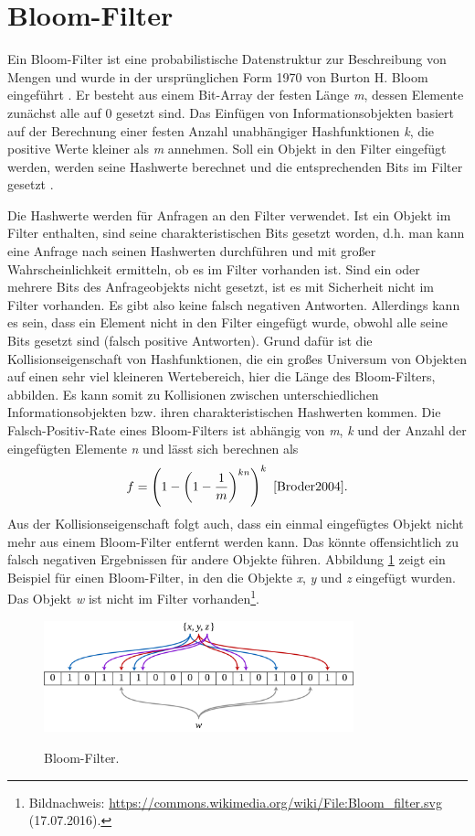 \section{Bloom-Filter}\label{sec:bloom}
Ein Bloom-Filter ist eine probabilistische Datenstruktur zur Beschreibung von Mengen und wurde in der ursprünglichen Form 1970 von Burton H. Bloom eingeführt \cite{Bloom1970}. Er besteht aus einem Bit-Array der festen Länge \textit{m}, dessen Elemente zunächst alle auf 0 gesetzt sind. Das Einfügen von Informationsobjekten basiert auf der Berechnung einer festen Anzahl unabhängiger Hashfunktionen \textit{k}, die positive Werte kleiner als \textit{m} annehmen. Soll ein Objekt in den Filter eingefügt werden, werden seine Hashwerte berechnet und die entsprechenden Bits im Filter gesetzt \cite{Broder2004}. 

Die Hashwerte werden für Anfragen an den Filter verwendet. Ist ein Objekt im Filter enthalten, sind seine charakteristischen Bits gesetzt worden, d.h. man kann eine Anfrage nach seinen Hashwerten durchführen und mit großer Wahrscheinlichkeit ermitteln, ob es im Filter vorhanden ist. Sind ein oder mehrere Bits des Anfrageobjekts nicht gesetzt, ist es mit Sicherheit nicht im Filter vorhanden. Es gibt also keine falsch negativen Antworten. Allerdings kann es sein, dass ein Element nicht in den Filter eingefügt wurde, obwohl alle seine Bits gesetzt sind (falsch positive Antworten). Grund dafür ist die Kollisionseigenschaft von Hashfunktionen, die ein großes Universum von Objekten auf einen sehr viel kleineren Wertebereich, hier die Länge des Bloom-Filters, abbilden. Es kann somit zu Kollisionen zwischen unterschiedlichen Informationsobjekten bzw. ihren charakteristischen Hashwerten kommen. Die Falsch-Positiv-Rate eines Bloom-Filters ist abhängig von \textit{m}, \textit{k} und der Anzahl der eingefügten Elemente \textit{n} und lässt sich berechnen als 
\[f = \left(1 - \left(1-\frac{1}{m}\right)^{kn}\right)^k\text{ \cite{Broder2004}}.\]
Aus der Kollisionseigenschaft folgt auch, dass ein einmal eingefügtes Objekt nicht mehr aus einem Bloom-Filter entfernt werden kann. Das könnte offensichtlich zu falsch negativen Ergebnissen für andere Objekte führen. Abbildung \ref{fig:pic0} zeigt ein Beispiel für einen Bloom-Filter, in den die Objekte \textit{x}, \textit{y} und \textit{z} eingefügt wurden. Das Objekt \textit{w} ist nicht im Filter vorhanden\footnote{Bildnachweis: \url{https://commons.wikimedia.org/wiki/File:Bloom_filter.svg} (17.07.2016).}.
\begin{figure}[hpbt]
  \centering
  \includegraphics[width=0.8\textwidth]{pictures/1280px-Bloom_filter.png}\\
  \caption[Bloom-Filter]{Bloom-Filter.}\label{fig:pic0}
\end{figure}
